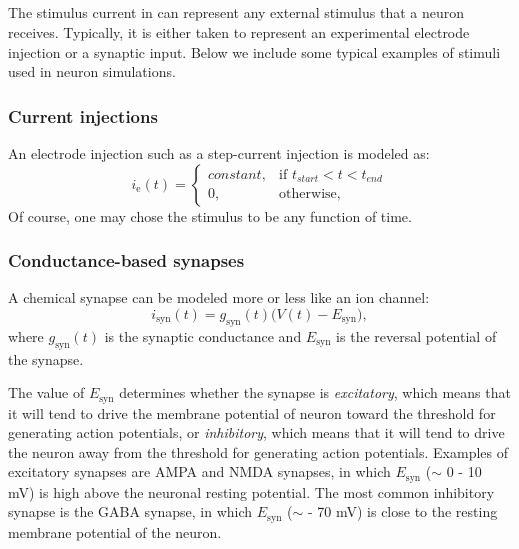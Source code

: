 \subsection{}
\label{sec:Neuron:stim}
The stimulus current in  can represent any external stimulus that a neuron receives. Typically, it is either taken to represent an experimental electrode injection or a synaptic input. Below we include some typical examples of stimuli used in neuron simulations. 

\subsubsection{Current injections}
An electrode injection such as a step-current injection is modeled as:
\begin{equation}
i_\text{e}(t)= 
\begin{cases}
    constant, & \text{if } t_{start} < t < t_{end} \\
    0,              & \text{otherwise},
\end{cases}
\label{eq:Neuron:injected}
\end{equation}
Of course, one may chose the stimulus to be any function of time.


\subsubsection{Conductance-based synapses}
\label{sec:Ch-Neuron:conductance-based-synapses}
A chemical synapse can be modeled more or less like an ion channel:
\begin{equation}
i_\text{syn}(t) = {g}_\text{syn}(t) \big(V(t)-E_\text{syn} \big), 
\label{eq:Neuron:chemicalsynapse}
\end{equation}
where $g_\text{syn}(t)$ is the synaptic conductance and $E_\text{syn}$ is the reversal potential of the synapse. 

The value of $E_\text{syn}$ determines whether the synapse is \textit{excitatory}, which means that it will tend to drive the  membrane potential of neuron toward the threshold for generating action potentials, or \textit{inhibitory}, which means that it will tend to drive the neuron away from the threshold for generating action potentials. Examples of excitatory synapses are AMPA and NMDA synapses, in which $E_\text{syn}$ ($\sim$ 0 - 10 mV) is high above the neuronal resting potential. The most common inhibitory synapse is the GABA synapse, in which $E_\text{syn}$ ($\sim$ - 70 mV) is close to the resting membrane potential of the neuron.

